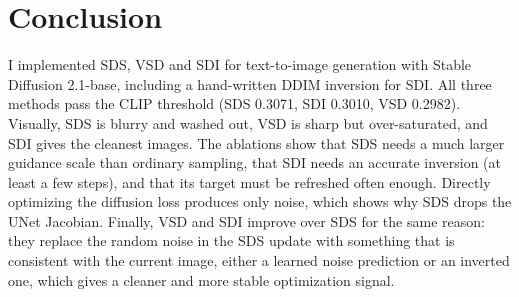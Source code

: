 \section{Conclusion}
\label{sec:conclusion}

I implemented SDS, VSD and SDI for text-to-image generation with Stable Diffusion 2.1-base, including a hand-written DDIM inversion for SDI.
All three methods pass the CLIP threshold (SDS 0.3071, SDI 0.3010, VSD 0.2982).
Visually, SDS is blurry and washed out, VSD is sharp but over-saturated, and SDI gives the cleanest images.
The ablations show that SDS needs a much larger guidance scale than ordinary sampling, that SDI needs an accurate inversion (at least a few steps), and that its target must be refreshed often enough.
Directly optimizing the diffusion loss produces only noise, which shows why SDS drops the UNet Jacobian.
Finally, VSD and SDI improve over SDS for the same reason: they replace the random noise in the SDS update with something that is consistent with the current image, either a learned noise prediction or an inverted one, which gives a cleaner and more stable optimization signal.
